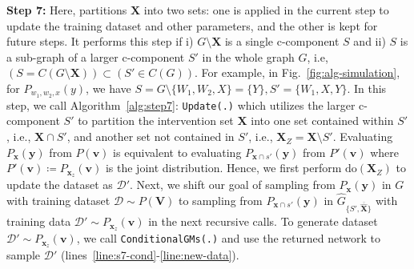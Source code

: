 \documentclass{article}
\newcommand{\x}{\mathbf{x}}
\newcommand{\y}{\mathbf{y}}
\newcommand{\X}{\mathbf{X}}
\newcommand{\Xp}{{\hat{\mathbf{X}}}}
\newcommand{\Gp}{{\hat{{G}}}}
\newcommand{\V}{\mathbf{V}}
\newcommand{\vb}{\mathbf{v}}
\newcommand{\mbf}{\mathbf}
\newcommand{\Do}{\text{do}}
\newcommand{\data}{\mathcal{D}}
\newcommand{\idgen}{\text{ID-GEN}\xspace}
\newcommand{\condgm}{\texttt{ConditionalGMs(.)}\xspace}
\newcommand{\stepsev}{\texttt{Update(.)}\xspace}
\theoremstyle{plain}
\theoremstyle{definition}
\theoremstyle{remark}
\begin{document}
\par \textbf{Step 7:}
Here, \idgen partitions $\X$ into two sets: one is applied in the current step to update the training dataset and other parameters, and the other is kept for future steps.
It performs this step if i) $G\setminus \X$ is a single c-component $S$ and ii)  $S$ is a sub-graph of a larger c-component $S'$ in the whole graph $G$, i.e, $(S = C(G\setminus \X)) \subset (S' \in C(G))$.
	For example, in Fig.~\ref{fig:alg-simulation}, for $P_{w_1, w_2,x}(y)$, we have $S= G\setminus\{W_1, W_2, X\}=\{Y\}, S'=\{W_1, X,Y\}$.
%
 In this step, we call Algorithm~\ref{alg:step7}: \stepsev 
 which utilizes the larger c-component $S'$ to partition the intervention set $\X$ into one set contained within $S'$, i.e., $\mbf{X} \cap S'$, and another set not contained in $S'$, i.e., $\X_Z = \X \setminus S'$. 
	Evaluating $P_{\x}(\y)$ from $P(\vb)$ is equivalent to evaluating $P_{\x\cap s'}(\y)$ from  $P'(\vb)$ where  $P'(\vb)\coloneqq P_{\x_z}(\vb)$ is the joint distribution.
 Hence, we first perform $\Do(\X_Z)$ to update the dataset as $\data'$. Next, we shift our goal of sampling from $P_{\x}(\y)$ in $G$ with training dataset $\data \sim P(\V)$ to
sampling from $P_{\x\cap s'}(\y)$ in $\Gp_{\{S', \overline{\Xp}\}}$ with training data $\data' \sim P_{\x_z}(\vb)$ in the next recursive calls. 
To generate dataset $\data' \sim P_{\x_z}(\vb)$,
we call \condgm and use the returned network to sample $\data'$ (lines~\ref{line:s7-cond}-\ref{line:new-data}).
%	
%
\end{document}
